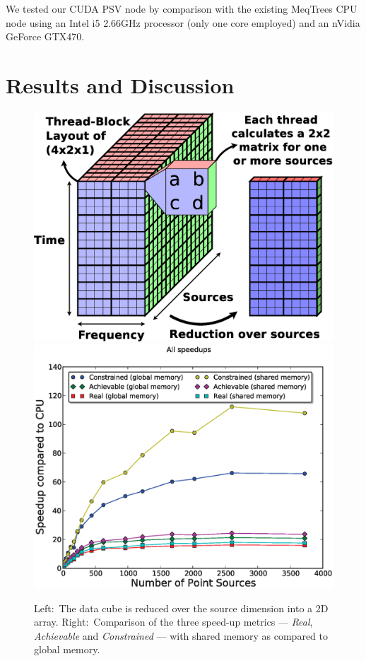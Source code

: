 We tested our CUDA PSV node by comparison with the existing MeqTrees CPU node using an Intel i5 2.66GHz processor (only one core employed) and an nVidia GeForce GTX470.


\section{Results and Discussion}

\begin{figure}
\begin{center}
\includegraphics[scale = 0.25]{part2/Baxter_O02/O02_f1}
\includegraphics[scale = 0.30]{part2/Baxter_O02/O02_f2}
\end{center}

\caption{ Left:~The data cube is reduced over the source dimension into a 2D array. Right:~Comparison of the three speed-up metrics  --- \emph{Real}, \emph{Achievable} and \emph{Constrained}  --- with shared memory as compared to global memory. }

\label{fig:shared_v_global} 
\end{figure}



